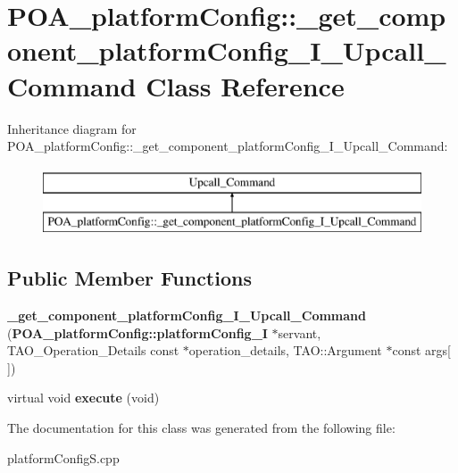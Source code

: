 \section{P\+O\+A\+\_\+platform\+Config\+:\+:\+\_\+get\+\_\+component\+\_\+platform\+Config\+\_\+\+I\+\_\+\+Upcall\+\_\+\+Command Class Reference}
\label{classPOA__platformConfig_1_1__get__component__platformConfig__I__Upcall__Command}
Inheritance diagram for P\+O\+A\+\_\+platform\+Config\+:\+:\+\_\+get\+\_\+component\+\_\+platform\+Config\+\_\+\+I\+\_\+\+Upcall\+\_\+\+Command\+:\begin{figure}[H]
\begin{center}
\leavevmode
\includegraphics[height=2.000000cm]{classPOA__platformConfig_1_1__get__component__platformConfig__I__Upcall__Command}
\end{center}
\end{figure}
\subsection*{Public Member Functions}
\begin{DoxyCompactItemize}
\item 
{\bfseries \+\_\+get\+\_\+component\+\_\+platform\+Config\+\_\+\+I\+\_\+\+Upcall\+\_\+\+Command} ({\bf P\+O\+A\+\_\+platform\+Config\+::platform\+Config\+\_\+I} $\ast$servant, T\+A\+O\+\_\+\+Operation\+\_\+\+Details const $\ast$operation\+\_\+details, T\+A\+O\+::\+Argument $\ast$const args[$\,$])\label{classPOA__platformConfig_1_1__get__component__platformConfig__I__Upcall__Command_a26dad8774f9a67bd54a66583373819b1}

\item 
virtual void {\bfseries execute} (void)\label{classPOA__platformConfig_1_1__get__component__platformConfig__I__Upcall__Command_a9cf1dd1efffc00b4cc69bb849b474fb3}

\end{DoxyCompactItemize}


The documentation for this class was generated from the following file\+:\begin{DoxyCompactItemize}
\item 
platform\+Config\+S.\+cpp\end{DoxyCompactItemize}
